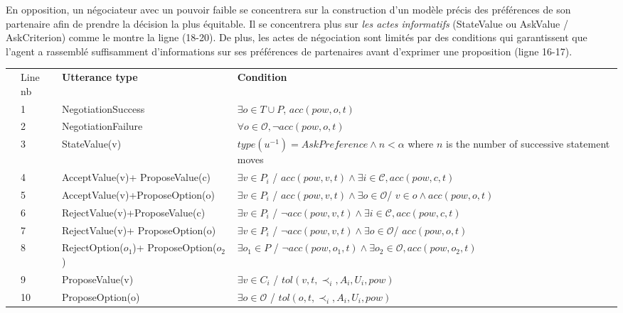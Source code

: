 		En opposition, un négociateur avec un pouvoir faible se concentrera sur la construction d'un modèle précis des préférences de son partenaire afin de prendre la décision la plus équitable. Il se concentrera plus sur \emph {les actes informatifs} (StateValue ou AskValue / AskCriterion) comme le montre la ligne (18-20). De plus, les actes de négociation sont limités par des conditions qui garantissent que l'agent a rassemblé suffisamment d'informations sur ses préférences de partenaires avant d'exprimer une proposition (ligne 16-17).
			\begin{table}[!t]
				{%
					\centering
					\begin{tabular}{|p{.3cm}|p{.6cm}|p{3cm}|p{7.5cm}|}
						\hline
						\parbox[t]{2mm}{}&Line nb& \textbf{Utterance type} & \textbf{Condition} \\
						&1&NegotiationSuccess & $\exists o \in T\cup P$, $acc(pow,o,t)$ \\
						& 2& NegotiationFailure & $ \forall o \in \mathcal{O},  \neg acc(pow,o,t)$\\
						&3& StateValue(v) & $type(u^{-1}) = AskPreference \land n < \alpha$ \newline where $n$ is the number of successive statement moves\\
						&4& AcceptValue(v)+ \newline ProposeValue(c) & $ \exists v \in P_i$ / $acc(pow,v,t) \land \exists i\in\mathcal{C}, acc(pow,c,t)$ \\
						&5& AcceptValue(v)+\newline ProposeOption(o) &  $ \exists v \in P_i$ / $ acc(pow,v,t) \land \exists o \in \mathcal{O}$/ $ v \in o \land acc(pow,o,t)$ \\
						&6& RejectValue(v)+\newline ProposeValue(c) & $ \exists v \in P_i$ / $ \neg acc(pow,v,t) \land \exists i\in\mathcal{C}, acc(pow,c,t)$ \\
						&7& RejectValue(v)+ \newline ProposeOption(o) &  $ \exists v \in P_i$ / $  \neg acc(pow,v,t) \land \exists o \in \mathcal{O}$/ $acc(pow,o,t)$ \\
						& 8&RejectOption($o_1$)+ ProposeOption($o_2$) & $ \exists o_1 \in P$ / $ \neg acc(pow,o_1,t) \land \exists o_2\in\mathcal{O}, acc(pow,o_2,t)$ \\
						&9& ProposeValue(v) & $\exists v \in C_i$ / $tol(v, t, \prec_i, A_i, U_i, pow)$\\
						&10& ProposeOption(o) & $\exists o \in \mathcal{O}$ / $tol(o, t, \prec_i, A_i, U_i, pow)$\\
						

\end{tabular}}
\end{table}
